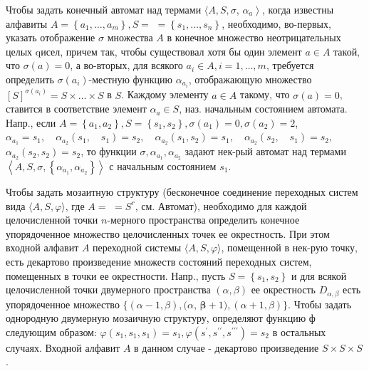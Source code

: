 \documentclass[10pt]{article}
\begin{document}
Чтобы задать конечный автомат над термами $\langle A, S, \sigma$, $\left.\alpha_{a}\right\rangle$, когда известны алфавиты $A=\left\{a_{1}, \ldots, a_{m}\right\}, S=$ $=\left\{s_{1}, \ldots, s_{n}\right\}$, необходимо, во-первых, указать отображение $\sigma$ множества $A$ в конечное множество неотрицательных целых qисел, причем так, чтобы существовал хотя бы один элемент $a \in A$ такой, что $\sigma(a)=0$, а во-вторых, для всякого $a_{i} \in A, i=1, \ldots, m$, требуется определить $\sigma\left(a_{i}\right)$-местную функцию $\alpha_{a_{i}}$, отображающую множество $[S]^{\sigma\left(a_{i}\right)}=S \times \ldots \times S$ в $S$. Каждому элементу $a \in A$ такому, что $\sigma(a)=0$, ставится в соответствие элемент $\alpha_{a} \in S$, наз. начальным состоянием автомата. Напр., если $A=\left\{a_{1}, a_{2}\right\}, S=\left\{s_{1}, s_{2}\right\}, \sigma\left(a_{1}\right)=0, \sigma\left(a_{2}\right)=2$, $\alpha_{a_{1}}=s_{1}, \quad \alpha_{a_{2}}\left(s_{1}, \quad s_{1}\right)=s_{2}, \quad \alpha_{a_{2}}\left(s_{1}, s_{2}\right)=s_{1}, \quad \alpha_{a_{2}}\left(s_{2}, \quad s_{1}\right)=s_{2}$, $\alpha_{a_{2}}\left(s_{2}, s_{2}\right)=s_{2}$, то функции $\sigma, \alpha_{a_{1}}, \alpha_{a_{2}}$ задают нек-рый автомат над термами $\left\langle A, S, \sigma,\left\{\alpha_{a_{1}}, \alpha_{a_{2}}\right\}\right\rangle$ с начальным состоянием $s_{1}$.



Чтобы задать мозаитную структуру (бесконечное соединение переходных систем вида $\langle A, S, \varphi\rangle$, где $A=$ $=S^{r}$, см. Автомат), необходимо для каждой целочисленной точки $n$-мерного пространства определить конечное упорядоченное множество целочисленных точек ее окрестность. При этом входной алфавит $A$ переходной системы $\langle A, S, \varphi\rangle$, помещенной в нек-рую точку, есть декартово произведение множеств состояний переходных систем, помещенных в точки ее окрестности. Напр., пусть $S=\left\{s_{1}, s_{2}\right\}$ и для всякой целочисленной точки двумерного пространства $(\alpha, \beta)$ ее окрестность $D_{\alpha, \beta}$ есть упорядоченное множество $\{(\alpha-1, \beta),(\alpha$, $\boldsymbol{\beta}+1),(\alpha+1, \beta)\}$. Чтобы задать однородную двумерную мозаичную структуру, определяют функцию $ф$ следующим образом: $\varphi\left(s_{1}, s_{1}, s_{1}\right)=s_{1}, \varphi\left(s^{\prime}, s^{\prime \prime}, s^{\prime \prime \prime}\right)=s_{2}$ в остальных случаях. Входной алфавит $A$ в данном случае - декартово произведение $S \times S \times S$.
\end{document}
